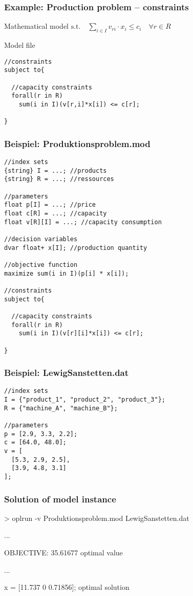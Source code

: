 \begin{frame}[fragile]\small
 \frametitle{Example: Production problem -- constraints}
 \begin{block}{Mathematical model}
  $\text{s.t.}\quad\displaystyle\sum_{i\in I} v_{ri}\cdot x_i \leq c_i  \quad\forall r\in R$
 \end{block}
 \begin{block}{Model file}\scriptsize
\begin{lstlisting}[numbers=none]
//constraints
subject to{
  
  //capacity constraints
  forall(r in R)
    sum(i in I)(v[r,i]*x[i]) <= c[r];
  
}  
\end{lstlisting}
 \end{block}
\end{frame}

\begin{frame}[fragile]
 \frametitle{Beispiel: Produktionsproblem.mod}
 \medskip
\begin{lstlisting}[basicstyle=\scriptsize\ttfamily]
//index sets
{string} I = ...; //products
{string} R = ...; //ressources

//parameters
float p[I] = ...; //price
float c[R] = ...; //capacity
float v[R][I] = ...; //capacity consumption

//decision variables
dvar float+ x[I]; //production quantity

//objective function
maximize sum(i in I)(p[i] * x[i]);

//constraints
subject to{
  
  //capacity constraints
  forall(r in R)
    sum(i in I)(v[r][i]*x[i]) <= c[r];
  
}   
\end{lstlisting}
\end{frame}

\begin{frame}[fragile]
 \frametitle{Beispiel: LewigSanstetten.dat}
 \medskip
\begin{lstlisting}[basicstyle=\scriptsize\ttfamily]
//index sets
I = {"product_1", "product_2", "product_3"}; 
R = {"machine_A", "machine_B"}; 
 
//parameters
p = [2.9, 3.3, 2.2];
c = [64.0, 48.0];
v = [
  [5.3, 2.9, 2.5],
  [3.9, 4.8, 3.1]
]; 
\end{lstlisting}
\end{frame}

\begin{frame}
 \frametitle{Solution of model instance}
 \ttfamily
 > oplrun -v Produktionsproblem.mod LewigSanstetten.dat
 \begin{center}
  \textsf ...
 \end{center}
 OBJECTIVE: 35.61677 \hfill\alert{\textsf{\textleftarrow{} optimal value}}
 \begin{center}
  \textsf ...
 \end{center}
 x = [11.737 0 0.71856]; \hfill\alert{\textsf{\textleftarrow{} optimal solution}}
\end{frame}
